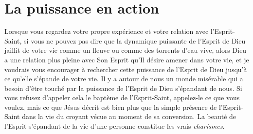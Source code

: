 \section*{La puissance en action}


Lorsque vous regardez votre propre expérience et votre relation
 avec l'Esprit-Saint, si vous ne pouvez pas dire que la dynamique puissante
 de l'Esprit de Dieu jaillit de votre vie comme un fleuve ou comme
 des torrents d'eau vive, alors Dieu a une relation plus pleine
 avec Son Esprit qu'Il désire amener dans votre vie,
 et je voudrais vous encourager à rechercher cette puissance de l'Esprit
 de Dieu jusqu'à ce qu'elle s'épande de votre vie.
 Il y a autour de nous un monde misérable qui a besoin d'être touché
 par la puissance de l'Esprit de Dieu s'épandant de nous.
 Si vous refusez d'appeler cela le baptème de l'Esprit-Saint,
 appelez-le ce que vous voulez, mais ce que Jésus décrit est bien plus
 que la simple présence de l'Esprit-Saint dans la vie du croyant
 vécue au moment de sa conversion. La beauté de l'Esprit s'épandant de la vie
 d'une personne constitue les vrais \emph{charismes}.


\closechapter
